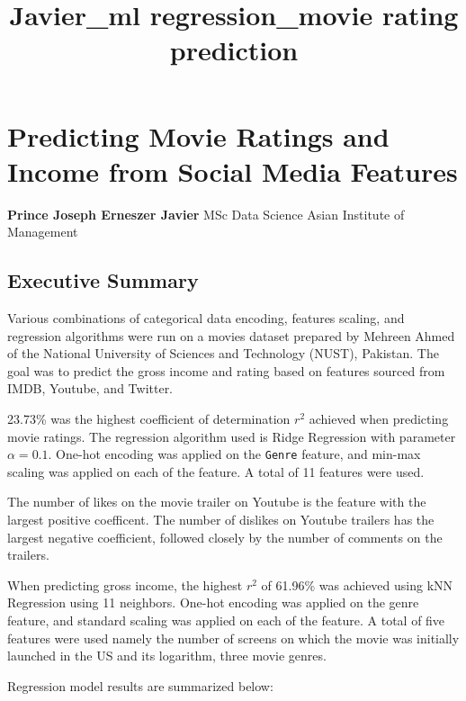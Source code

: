 \documentclass[11pt]{article}
\title{Javier\_ml regression\_movie rating prediction}
\begin{document}
    
    
    \maketitle
    
    

    
    \section{Predicting Movie Ratings and Income from Social Media
Features}\label{predicting-movie-ratings-and-income-from-social-media-features}

    \textbf{Prince Joseph Erneszer Javier} MSc Data Science Asian Institute
of Management

    \subsection{Executive Summary}\label{executive-summary}

    Various combinations of categorical data encoding, features scaling, and
regression algorithms were run on a movies dataset prepared by Mehreen
Ahmed of the National University of Sciences and Technology (NUST),
Pakistan. The goal was to predict the gross income and rating based on
features sourced from IMDB, Youtube, and Twitter.

23.73\% was the highest coefficient of determination \(r^2\) achieved
when predicting movie ratings. The regression algorithm used is Ridge
Regression with parameter \(\alpha = 0.1\). One-hot encoding was applied
on the \texttt{Genre} feature, and min-max scaling was applied on each
of the feature. A total of 11 features were used.

The number of likes on the movie trailer on Youtube is the feature with
the largest positive coefficent. The number of dislikes on Youtube
trailers has the largest negative coefficient, followed closely by the
number of comments on the trailers.

When predicting gross income, the highest \(r^2\) of 61.96\% was
achieved using kNN Regression using 11 neighbors. One-hot encoding was
applied on the genre feature, and standard scaling was applied on each
of the feature. A total of five features were used namely the number of
screens on which the movie was initially launched in the US and its
logarithm, three movie genres.

Regression model results are summarized below:
\end{document}
